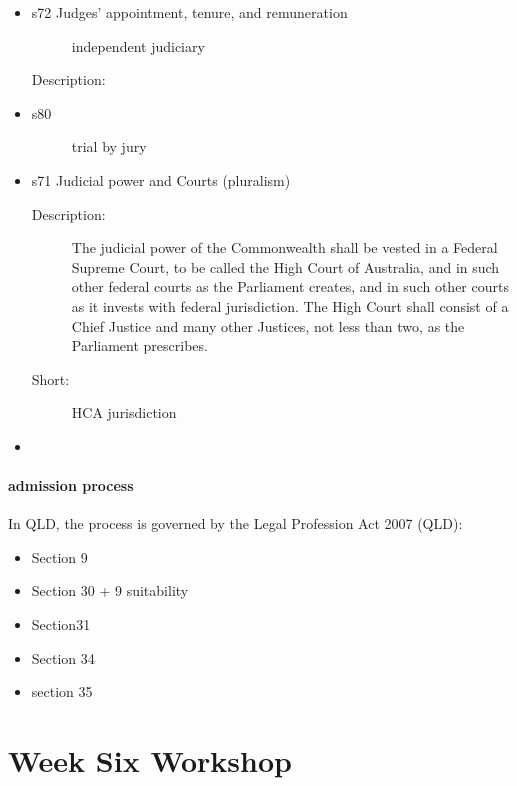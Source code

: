 \begin{itemize}
    \item s72  Judges' appointment, tenure, and remuneration
        \begin{description}
            \item[] independent judiciary
            \item[Description:]
        \end{description}
    \item s80 
        \begin{description}
            \item[] trial by jury
        \end{description}
    \item s71 Judicial power and Courts (pluralism)
        \begin{description}
            \item[Description:]The judicial power of the Commonwealth shall be vested in a Federal Supreme Court, to be called the High Court of Australia, and in such other federal courts as the Parliament creates, and in such other courts as it invests with federal jurisdiction. The High Court shall consist of a Chief Justice and many other Justices, not less than two, as the Parliament prescribes.
            \item[Short:]HCA jurisdiction
        \end{description}
    \item 
\end{itemize}

\paragraph{admission process}
In QLD, the process is governed by the Legal Profession Act 2007 (QLD):
\begin{itemize}
    \item Section 9
    \item Section 30 + 9 suitability
    \item Section31
    \item Section 34
    \item section 35
\end{itemize}


\section*{Week Six Workshop}

